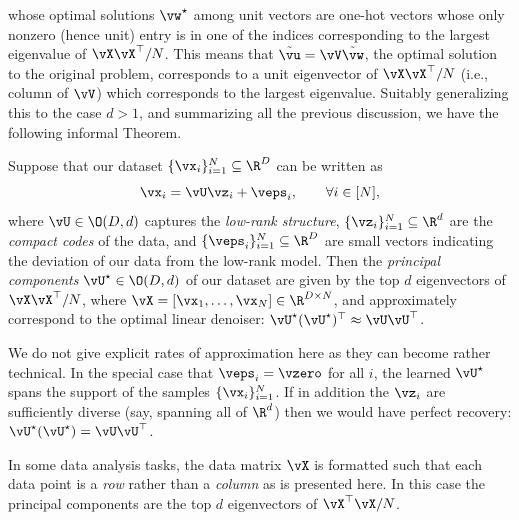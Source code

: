 \documentclass[../../book-main.tex]{subfiles}
\begin{document}
whose optimal solutions \(\vw^{\star}\) among unit vectors are one-hot vectors whose only nonzero (hence unit) entry is in one of the indices corresponding to the largest eigenvalue of \(\vX\vX^{\top}/N\). This means that \(\tilde{\vu} = \vV\tilde{\vw}\), the optimal solution to the original problem, corresponds to a unit eigenvector of \(\vX\vX^{\top}/N\) (i.e., column of \(\vV\)) which corresponds to the largest eigenvalue.  Suitably generalizing this to the case \(d > 1\), and summarizing all the previous discussion, we have the following informal Theorem.
\begin{theorem}\label{thm:pca}
    Suppose that our dataset \(\{\vx_{i}\}_{i = 1}^{N} \subseteq \R^{D}\) can be written as 
    \begin{equation}
        \vx_{i} = \vU\vz_{i} + \veps_{i}, \qquad \forall i \in [N],
    \end{equation}
    where \(\vU \in \O(D, d)\) captures the \textit{low-rank structure},
    \(\{\vz_{i}\}_{i = 1}^{N} \subseteq \R^{d}\) are the \textit{compact codes}
    of the data, and \(\{\veps_{i}\}_{i = 1}^{N} \subseteq \R^{D}\) are small
    vectors indicating the deviation of our data from the low-rank model. Then
    the \textit{principal components} \(\vU^{\star} \in \O(D, d)\) of our
    dataset are given by the top \(d\) eigenvectors of \(\vX\vX^{\top}/N\),
    where \(\vX = [\vx_{1}, \dots, \vx_{N}] \in \R^{D \times N}\), and
    approximately correspond to the optimal linear denoiser:
    \(\vU^{\star}(\vU^{\star})^{\top} \approx \vU\vU^{\top}\).
\end{theorem}
We do not give explicit rates of approximation here as they can become rather
technical. In the special case that \(\veps_{i} = \vzero\) for all \(i\), the
learned \(\vU^{\star}\) spans the support of the samples \(\{\vx_{i}\}_{i
= 1}^{N}\). If in addition the \(\vz_{i}\) are sufficiently diverse (say,
spanning all of \(\R^{d}\)) then we would have perfect recovery:
\(\vU^{\star}(\vU^{\star}) = \vU\vU^{\top}\).


\begin{remark}
    In some data analysis tasks, the data matrix \(\vX\) is formatted such that each data point is a \textit{row} rather than a \textit{column} as is presented here. In this case the principal components are the top \(d\) eigenvectors of \(\vX^{\top}\vX/N\).
\end{remark}
\end{document}
